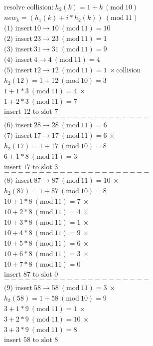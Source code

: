 \documentclass[a4paper]{article}
\newcommand{\Mod}[1]{\ (\mathrm{mod}\ #1)}
\begin{document}
\begin{minipage}{8cm}
\begin{align*}
  &\text{resolve collision:}\ h_2(k) = 1 + k \Mod{10} \\
  & new_k = (h_1(k) + i * h_2(k)) \Mod{11}\\
  &\text{(1) insert}\ 10 \to 10 \Mod{11} = 10\\
  &\text{(2) insert}\ 23 \to 23 \Mod{11} = 1\\
  &\text{(3) insert}\ 31 \to 31 \Mod{11} = 9\\
  &\text{(4) insert}\ 4 \to 4 \Mod{11} = 4\\
  &\text{(5) insert}\ 12 \to  12 \Mod{11} = 1\ \times\text{collision} \\
  & h_2(12) = 1 + 12 \Mod{10} = 3\\
  & 1 + 1 * 3 \Mod{11} = 4\ \times \\
  & 1 + 2 * 3 \Mod{11} = 7\ \\
  &\text{insert $12$ to slot $7$}\\
  &---------------------\\
  &\text{(6) insert}\ 28\to 28\Mod{11} = 6\\
  &\text{(7) insert}\ 17\to 17\Mod{11} = 6\ \times \\
  & h_2(17) = 1 + 17 \Mod{10} = 8\\
  & 6 + 1 * 8 \Mod{11} = 3\\
  &\text{insert $17$ to slot $3$}\\
  &---------------------\\
  &\text{(8) insert}\ 87\to 87\Mod{11} = 10\ \times \\
  & h_2(87) = 1 + 87 \Mod{10} = 8\\
  & 10 + 1 * 8 \Mod{11} = 7\ \times \\
  & 10 + 2 * 8 \Mod{11} = 4\ \times \\
  & 10 + 3 * 8 \Mod{11} = 1\ \times \\
  & 10 + 4 * 8 \Mod{11} = 9\ \times \\
  & 10 + 5 * 8 \Mod{11} = 6\ \times \\
  & 10 + 6 * 8 \Mod{11} = 3\ \times \\
  & 10 + 7 * 8 \Mod{11} = 0\ \\
  &\text{insert $87$ to slot $0$}\\
  &---------------------\\
  &\text{(9) insert}\ 58\to 58\Mod{11} = 3\ \times\\
  & h_2(58) = 1 + 58 \Mod{10} = 9\\
  & 3 + 1 * 9 \Mod{11} = 1\ \times \\
  & 3 + 2 * 9 \Mod{11} = 10\ \times \\
  & 3 + 3 * 9 \Mod{11} = 8  \\
  &\text{insert $58$ to slot $8$}\\
\end{align*}
\end{minipage}
\end{document}
